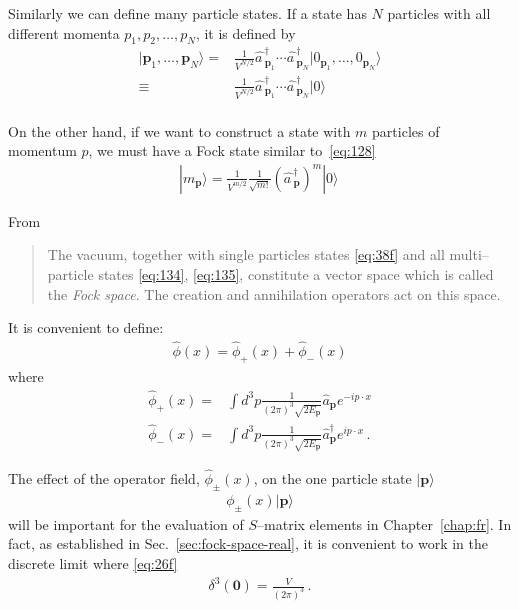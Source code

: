 \begin{frame}
Similarly we can define many particle states. If a state has $N$ particles with all different momenta $p_1,p_2,\ldots,p_N$, it is defined by
\begin{align}
  \label{eq:134}
  |\mathbf{p}_1,\ldots,\mathbf{p}_N\rangle=&\frac{1}{V^{N/2}}\widehat{a\,}_{\mathbf{p}_1}^\dagger\cdots
\widehat{a\,}_{\mathbf{p}_N}^\dagger|0_{\mathbf{p}_1},\ldots,0_{\mathbf{p}_N}\rangle\nonumber\\
\equiv&\frac{1}{V^{N/2}}\widehat{a\,}_{\mathbf{p}_1}^\dagger\cdots
\widehat{a\,}_{\mathbf{p}_N}^\dagger|0\rangle\nonumber\\
\end{align}
\end{frame}
On the other hand, if we want to construct a state with $m$ particles of momentum $p$, we must have a Fock state similar to~\eqref{eq:128}
\begin{align}
\label{eq:135}
  |m_{\mathbf{p}}\rangle=\frac{1}{V^{m/2}}\frac{1}{\sqrt{m!}}\left(\widehat{a\,}_{\mathbf{p}}^\dagger\right)^{m}|0\rangle\,
\end{align}

From\cite{Lahiri:2005sm}
\begin{quote}
  The vacuum, together with single particles states \eqref{eq:38f} and all multi--particle states \eqref{eq:134}, \eqref{eq:135}, constitute a vector space which is called the \emph{Fock space}. The creation and annihilation operators act on this space.
\end{quote}


\begin{frame}
It is convenient to define: 
\begin{align}
\label{eq:36}
  \widehat{\phi}(x)=\widehat{\phi}_+(x)+\widehat{\phi}_-(x)
\end{align}
where
\begin{align}
\label{eq:37f}
  \widehat{\phi}_+(x)=&\int d^3p \frac{1}{(2\pi)^3\sqrt{2E_\mathbf{p} }}
  \widehat{a}_\mathbf{p} e^{-i p\cdot x }\nonumber\\
  \widehat{\phi}_-(x)=&\int d^3p \frac{1}{(2\pi)^3\sqrt{2E_\mathbf{p} }}\widehat{a}_\mathbf{p}^\dagger e^{i p\cdot x }\,.
\end{align}
\end{frame}
The effect of the operator field, $\widehat{\phi}_\pm(x)$, on the one particle state $|\mathbf{p}\rangle$
\begin{align}
  \phi_\pm(x)|\mathbf{p}\rangle
\end{align}
will be important for the evaluation of $S$--matrix elements in Chapter~\ref{chap:fr}. In fact,
as established in Sec.~\ref{sec:fock-space-real}, it is convenient to work in the discrete limit where \eqref{eq:26f}
\begin{align}
   \delta^3(\mathbf{0})=\frac{V}{(2\pi)^3}\,.
\end{align}

